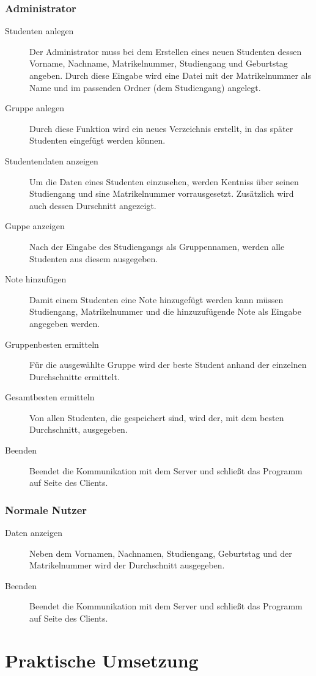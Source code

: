 \documentclass{scrartcl}
\begin{document}
		\subsubsection{Administrator}
			\begin{description}
				\item[Studenten anlegen] Der Administrator muss bei dem Erstellen eines neuen Studenten dessen Vorname, Nachname, Matrikelnummer, Studiengang und Geburtstag angeben. Durch diese Eingabe wird eine Datei mit der Matrikelnummer als Name und im passenden Ordner (dem Studiengang) angelegt.
				\item[Gruppe anlegen] Durch diese Funktion wird ein neues Verzeichnis erstellt, in das später Studenten eingefügt werden können.
				\item[Studentendaten anzeigen] Um die Daten eines Studenten einzusehen, werden Kentniss über seinen Studiengang und sine Matrikelnummer vorrausgesetzt. Zusätzlich wird auch dessen Durschnitt angezeigt.
				\item[Guppe anzeigen] Nach der Eingabe des Studiengangs als Gruppennamen, werden alle Studenten aus diesem ausgegeben.
				\item[Note hinzufügen] Damit einem Studenten eine Note hinzugefügt werden kann müssen Studiengang, Matrikelnummer und die hinzuzufügende Note als Eingabe angegeben werden.
				\item[Gruppenbesten ermitteln] Für die ausgewählte Gruppe wird der beste Student anhand der einzelnen Durchschnitte ermittelt.
				\item[Gesamtbesten ermitteln] Von allen Studenten, die gespeichert sind, wird der, mit dem besten Durchschnitt, ausgegeben.
				\item[Beenden] Beendet die Kommunikation mit dem Server und schließt das Programm auf Seite des Clients.
			\end{description}
			\subsubsection{Normale Nutzer}
			\begin{description}
				\item[Daten anzeigen] Neben dem  Vornamen, Nachnamen, Studiengang, Geburtstag und der Matrikelnummer wird der Durchschnitt ausgegeben.
				\item[Beenden] Beendet die Kommunikation mit dem Server und schließt das Programm auf Seite des Clients.
			\end{description}
\section{Praktische Umsetzung}
\end{document}
